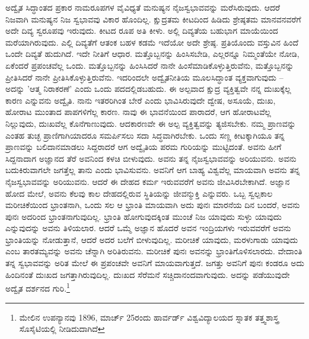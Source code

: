 ಅದ್ವೈತ ಸಿದ್ಧಾಂತದ ಪ್ರಕಾರ ನಾಮರೂಪಗಳ ವೈವಿಧ್ಯತೆ ಮನುಷ್ಯನ ನೈಜಸ್ವಭಾವವನ್ನು ಮರೆಸಿರುವುದು. ಆದರೆ ನಿಜವಾಗಿ ಮನುಷ್ಯನ ನಿಜ ಸ್ವಭಾವವು ವಿಕಾರ ಹೊಂದಿಲ್ಲ. ಕ್ಷುದ್ರತಮ ಕೀಟದಿಂದ ಹಿಡಿದು ಶ್ರೇಷ್ಠತಮ ಮಾನವನವರೆಗೆ ಅದೇ ದಿವ್ಯ ಸ್ವರೂಪವು ಇರುವುದು. ಕೀಟದ ರೂಪ ಅತಿ ಕೀಳು. ಅಲ್ಲಿ ದಿವ್ಯತೆಯ ಬಹುಭಾಗ ಮಾಯೆಯಿಂದ ಮರೆಯಾಗಿರುವುದು. ಎಲ್ಲಿ ದಿವ್ಯತೆಗೆ ಆತಂಕ ಬಹಳ ಕಡಮೆ ಇದೆಯೋ ಅದೇ ಶ್ರೇಷ್ಠ. ಪ್ರತಿಯೊಂದು ವಸ್ತುವಿನ ಹಿಂದೆ ಒಂದೇ ದಿವ್ಯತೆ ಹುದುಗಿದೆ. ಇದೇ ನೀತಿಗೆ ಆಧಾರ. ಮತ್ತೊಬ್ಬನನ್ನು ಹಿಂಸಿಸಬೇಡಿ, ಎಲ್ಲರನ್ನೂ ನಿಮ್ಮಂತೆಯೇ ನೋಡಿ, ಏಕೆಂದರೆ ಪ್ರಪಂಚವೆಲ್ಲ ಒಂದು. ಮತ್ತೊಬ್ಬನನ್ನು ಹಿಂಸಿಸಿದರೆ ನಾನೇ ಹಿಂಸೆಮಾಡಿಕೊಳ್ಳುತ್ತಿರುವೆನು, ಮತ್ತೊಬ್ಬನನ್ನು ಪ್ರೀತಿಸಿದರೆ ನಾನೇ ಪ್ರೀತಿಸಿಕೊಳ್ಳುತ್ತಿರುವೆನು. ಇದರಿಂದಲೇ ಅದ್ವೈತನೀತಿಯ ಮೂಲಸಿದ್ಧಾಂತ ವ್ಯಕ್ತವಾಗುವುದು – ಅದನ್ನು 'ಆತ್ಮ ನಿರಾಕರಣೆ' ಎಂದು ಒಂದು ಪದದಲ್ಲಿಡಬಹುದು. ಈ ಅಲ್ಪವಾದ ಕ್ಷುದ್ರ ವ್ಯಕ್ತಿತ್ವವೇ ನನ್ನ ದುಃಖಕ್ಕೆಲ್ಲ ಕಾರಣ ಎನ್ನುವನು ಅದ್ವೈತಿ. ನಾನು ಇತರರಿಗಿಂತ ಬೇರೆ ಎಂದು ಭಾವಿಸಿರುವುದೇ ದ್ವೇಷ, ಅಸೂಯೆ, ದುಃಖ, ಹೋರಾಟ ಮುಂತಾದ ಪಾಪಗಳಿಗೆಲ್ಲ ಕಾರಣ. ನಾವು ಈ ಭಾವನೆಯಿಂದ ಪಾರಾದರೆ, ಆಗ ಹೋರಾಟವೆಲ್ಲ ನಿಲ್ಲುವುದು, ದುಃಖವೆಲ್ಲ ಕೊನೆಗಾಣುವುದು. ಆದಕಾರಣವೇ ಈ ಅಲ್ಪ ವ್ಯಕ್ತಿತ್ವವನ್ನು ತ್ಯಜಿಸಬೇಕು. ನಮ್ಮ ಪ್ರಾಣವನ್ನು ಎಂತಹ ತುಚ್ಛ ಪ್ರಾಣಿಗಾಗಿಯಾದರೂ ಸಮರ್ಪಿಸಲು ಸದಾ ಸಿದ್ಧವಾಗಿರಬೇಕು. ಒಂದು ಸಣ್ಣ ಕೀಟಕ್ಕಾಗಿಯೂ ತನ್ನ ಪ್ರಾಣವನ್ನು ಬಲಿದಾನಮಾಡಲು ಸಿದ್ದರಾದರೆ ಆಗ ಅದ್ವೈತಿಯ ಪರಮ ಗುರಿಯನ್ನು ಮುಟ್ಟಿದಂತೆ. ಅವನು ಹೀಗೆ ಸಿದ್ದನಾದಾಗ ಅಜ್ಞಾನದ ತೆರೆ ಅವನಿಂದ ಕಳಚಿ ಬೀಳುವುದು. ಅವನು ತನ್ನ ನೈಜಸ್ವಭಾವವನ್ನು ಅರಿಯುವನು. ಅವನು ಬದುಕಿರುವಾಗಲೇ ಜಗತ್ತೆಲ್ಲ ತಾನು ಎಂದು ಭಾವಿಸುವನು. ಅವನಿಗೆ ಆಗ ಬಾಹ್ಯ ವಿಶ್ವವೆಲ್ಲ ಮಾಯವಾಗಿ ಅವನು ತನ್ನ ನೈಜಸ್ವಭಾವವನ್ನು ಅರಿಯುವನು. ಆದರೆ ಈ ದೇಹದ ಕರ್ಮ ಇರುವವರೆಗೆ ಅವನು ಜೀವಿಸಿರಬೇಕಾಗಿದೆ. ಅಜ್ಞಾನ ಹೋದ ಮೇಲೆ, ಅವನು ಕೆಲವು ಕಾಲ ದೇಹದಲ್ಲಿರುವ ಸ್ಥಿತಿಯನ್ನು ಜೀವನ್ಮುಕ್ತಿ ಎನ್ನುವರು. ಒಬ್ಬ ಸ್ವಲ್ಪಕಾಲ ಮರೀಚಿಕೆಯಿಂದ ಭ್ರಾಂತನಾಗಿ, ಒಂದು ಸಲ ಆ ಭ್ರಾಂತಿ ಮಾಯವಾಗಿ ಅದು ಪುನಃ ಮಾರನೆಯ ದಿನ ಬಂದರೆ, ಅವನು ಪುನಃ ಅದರಿಂದ ಭ್ರಾಂತನಾಗುವುದಿಲ್ಲ. ಭ್ರಾಂತಿ ಹೋಗುವುದಕ್ಕಿಂತ ಮುಂಚೆ ನಿಜ ಯಾವುದು ಸುಳ್ಳು ಯಾವುದು ಎನ್ನುವುದನ್ನು ಅವನು ತಿಳಿಯಲಾರ. ಆದರೆ ಒಮ್ಮೆ ಅಜ್ಞಾನ ಹೊದರೆ ಅವನ ಇಂದ್ರಿಯಗಳು ಇರುವವರೆಗೆ ಅವನು ಭ್ರಾಂತಿಯನ್ನು ನೋಡುತ್ತಾನೆ, ಆದರೆ ಅದರ ಬಲೆಗೆ ಬೀಳುವುದಿಲ್ಲ. ಮರೀಚಿಕೆ ಯಾವುದು, ಮರಳುಗಾಡು ಯಾವುದು ಎಂಬ ತಾರತಮ್ಯವನ್ನು ಅವನು ಚೆನ್ನಾಗಿ ಅರಿತಿರುವನು. ಮರೀಚಿಕೆ ಪುನಃ ಅವನನ್ನು ಭ್ರಾಂತಿಗೊಳಿಸಲಾರದು. ವೇದಾಂತಿ ತನ್ನ ಸ್ವಭಾವವನ್ನು ಅರಿತ ಮೇಲೆ ಈ ಪ್ರಪಂಚವೇ ಅವನಿಗೆ ಮಾಯವಾಗುತ್ತದೆ. ಜಗತ್ತು ಅವನಿಗೆ ಪುನಃ ಕಂಡರೂ ಅದು ಹಿಂದಿನಂತೆ ದುಃಖದ ಜಗತ್ತಾಗಿರುವುದಿಲ್ಲ. ದುಃಖದ ಸೆರೆಮನೆ ಸಚ್ಚಿದಾನಂದವಾಗುವುದು. ಅದನ್ನು ಪಡೆಯುವುದೇ ಅದ್ವೈತ ದರ್ಶನದ ಗುರಿ.\footnote{ ಮೇಲಿನ ಉಪನ್ಯಾನವು 1896, ಮಾರ್ಚ್ 25ರಂದು ಹಾರ್ವರ್ಡ್ ವಿಶ್ವವಿದ್ಯಾಲಯದ ಸ್ನಾತಕ ತತ್ತ್ವಶಾಸ್ತ್ರ ಸೊಸೈಟಿಯಲ್ಲಿ ನೀಡಿದುದಾಗಿದೆ}

